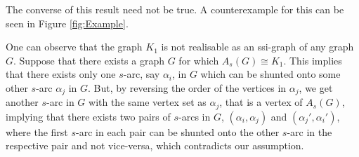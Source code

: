 \documentclass[12pt,a4paper,twoside]{article}
\theoremstyle{casesty}
\theoremstyle{subcasesty}
\theoremstyle{schemesty}
\begin{document}
The converse of this result need not be true. A counterexample for this can be seen in Figure \ref{fig:Example}.

One can observe that the graph $K_{1}$ is not realisable as an ssi-graph of any graph $G$. Suppose that there exists a graph $G$ for which $A_{s}(G) \cong K_{1}$. This implies that there exists only one $s$-arc, say $\alpha_{i}$, in $G$ which can be shunted onto some other $s$-arc $\alpha_{j}$ in $G$. But, by reversing the order of the vertices in $\alpha_{j}$, we get another $s$-arc in $G$ with the same vertex set as $\alpha_{j}$, that is a vertex of $A_{s}(G)$, implying that there exists two pairs of $s$-arcs in $G$, $(\alpha_{i},\alpha_{j})$ and $(\alpha_{j}',\alpha_{i}')$, where the first $s$-arc in each pair can be shunted onto the other $s$-arc in the respective pair and not vice-versa, which contradicts our assumption. 
\end{document}
